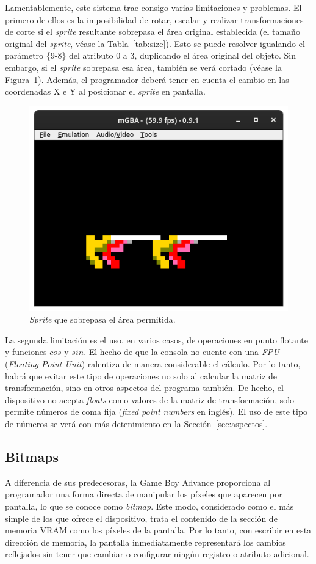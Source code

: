 Lamentablemente, este sistema trae consigo varias limitaciones y problemas. El primero de ellos es la imposibilidad de rotar, escalar y realizar transformaciones de corte si el \textit{sprite} resultante sobrepasa el área original establecida (el tamaño original del \textit{sprite}, véase la Tabla~\ref{tab:size}). Esto se puede resolver igualando el parámetro \{9-8\} del atributo 0 a 3, duplicando el área original del objeto. Sin embargo, si el \textit{sprite} sobrepasa esa área, también se verá cortado (véase la Figura~\ref{fig:too_big}). Además, el programador deberá tener en cuenta el cambio en las coordenadas X e Y al posicionar el \textit{sprite} en pantalla.


\begin{figure}[h]
	\centering
	\includegraphics[width=.55\textwidth]{capitulos/capitulo3/too_big.png}
	\caption{\textit{Sprite} que sobrepasa el área permitida.}
	\label{fig:too_big}
\end{figure}
\FloatBarrier{}

La segunda limitación es el uso, en varios casos, de operaciones en punto flotante y funciones $cos$ y $sin$. El hecho de que la consola no cuente con una \textit{FPU} (\textit{Floating Point Unit}) ralentiza de manera considerable el cálculo. Por lo tanto, habrá que evitar este tipo de operaciones no solo al calcular la matriz de transformación, sino en otros aspectos del programa también. De hecho, el dispositivo no acepta \textit{floats} como valores de la matriz de transformación, solo permite números de coma fija (\textit{fixed point numbers} en inglés). El uso de este tipo de números se verá con más detenimiento en la Sección~\ref{sec:aspectos}.

\subsection{Bitmaps}\label{sec:bitmaps}
A diferencia de sus predecesoras, la Game Boy Advance proporciona al programador una forma directa de manipular los píxeles que aparecen por pantalla, lo que se conoce como \textit{bitmap}. Este modo, considerado como el más simple de los que ofrece el dispositivo, trata el contenido de la sección de memoria VRAM como los píxeles de la pantalla. Por lo tanto, con escribir en esta dirección de memoria, la pantalla inmediatamente representará los cambios reflejados sin tener que cambiar o configurar ningún registro o atributo adicional.

